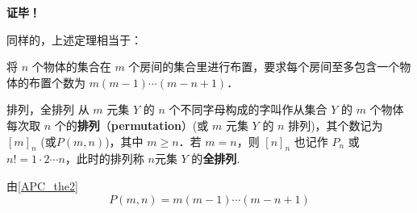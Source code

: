 \textbf{证毕！}

同样的，上述定理相当于：
\begin{theorem}{}\label{APC_the2}
将 $n$ 个物体的集合在 $m$ 个房间的集合里进行布置，要求每个房间至多包含一个物体的布置个数为 $m(m-1)\cdots(m-n+1)$．
\end{theorem}

\begin{definition}{排列，全排列}
从 $m$ 元集 $Y$ 的 $n$ 个不同字母构成的字叫作从集合 $Y$ 的 $m$ 个物体每次取 $n$ 个的\textbf{排列}（\textbf{permutation}）(或 $m$ 元集 $Y$ 的 $n$ 排列)，其个数记为 $[m]_n$ (或$P(m,n)$)，其中 $m\geq n$．若 $m=n$，则 $[n]_n$ 也记作 $P_n$ 或 $n!=1\cdot2\cdots n$，此时的排列称 $n$元集 $Y$ 的\textbf{全排列}.
\end{definition}
由\autoref{APC_the2} 
\begin{equation}
P(m,n)=m(m-1)\cdots(m-n+1)
\end{equation}

